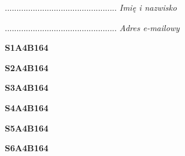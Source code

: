 \begin{turn}{90}\begin{minipage}{\linewidth} \vspace{20mm} ................................................  \textit{Imię i nazwisko}\end{minipage}\end{turn}

\begin{turn}{90}\begin{minipage}{\linewidth} \vspace{20mm} ................................................  \textit{Adres e-mailowy}\end{minipage}\end{turn}

\begin{turn}{90}\huge \begin{minipage}{\linewidth} \vspace{10mm}\textbf{S1A4B164}\end{minipage}\end{turn}

\begin{turn}{90}\huge \begin{minipage}{\linewidth} \vspace{10mm}\textbf{S2A4B164}\end{minipage}\end{turn}

\begin{turn}{90}\huge \begin{minipage}{\linewidth} \vspace{10mm}\textbf{S3A4B164}\end{minipage}\end{turn}

\begin{turn}{90}\huge \begin{minipage}{\linewidth} \vspace{10mm}\textbf{S4A4B164}\end{minipage}\end{turn}

\begin{turn}{90}\huge \begin{minipage}{\linewidth} \vspace{10mm}\textbf{S5A4B164}\end{minipage}\end{turn}

\begin{turn}{90}\huge \begin{minipage}{\linewidth} \vspace{10mm}\textbf{S6A4B164}\end{minipage}\end{turn}

